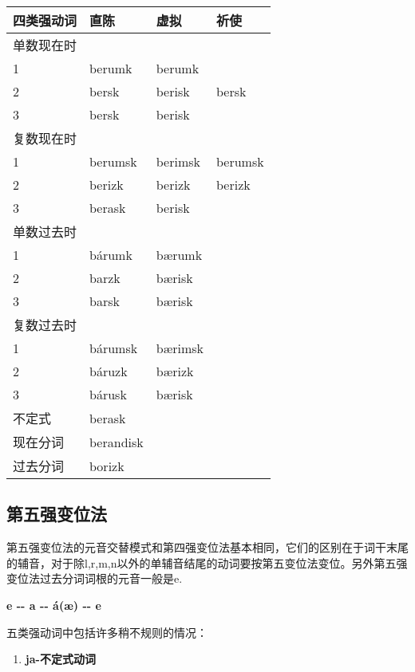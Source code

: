 \begin{longtable}{llll}
  \toprule
  四类强动词 & 直陈      & 虚拟    & 祈使    \\
  \midrule
  \endhead
  \bottomrule
  \endfoot
  单数现在时 &           &         &         \\
  1          & berumk    & berumk  &         \\
  2          & bersk     & berisk  & bersk   \\
  3          & bersk     & berisk  &         \\
  复数现在时 &           &         &         \\
  1          & berumsk   & berimsk & berumsk \\
  2          & berizk    & berizk  & berizk  \\
  3          & berask    & berisk  &         \\
  单数过去时 &           &         &         \\
  1          & bárumk    & bærumk  &         \\
  2          & barzk     & bærisk  &         \\
  3          & barsk     & bærisk  &         \\
  复数过去时 &           &         &         \\
  1          & bárumsk   & bærimsk &         \\
  2          & báruzk    & bærizk  &         \\
  3          & bárusk    & bærisk  &         \\
  不定式     & berask    &         &         \\
  现在分词   & berandisk &         &         \\
  过去分词   & borizk    &         &         \\
\end{longtable}

\subsection{第五强变位法}\label{第五强变位法}

第五强变位法的元音交替模式和第四强变位法基本相同，它们的区别在于词干末尾的辅音，对于除l,r,m,n以外的单辅音结尾的动词要按第五变位法变位。另外第五强变位法过去分词词根的元音一般是e.

\textbf{e -\/- a -\/- á(æ) -\/- e}

五类强动词中包括许多稍不规则的情况：

\begin{enumerate}
  \def\labelenumi{\arabic{enumi})}
  \item
        \textbf{ja-不定式动词}
\end{enumerate}

